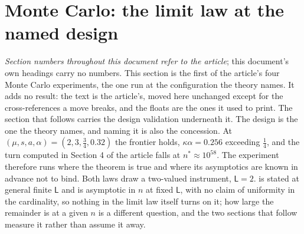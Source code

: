 \documentclass[
  12pt]{article}
\newcommand{\1}[1]{\mathds{1}\left[#1\right]}
\theoremstyle{plain}
\theoremstyle{definition}
\theoremstyle{definition}
\theoremstyle{remark}
\begin{document}
%
%
%
\clearpage

\section*{Monte Carlo: the limit law at the named design}

\emph{Section numbers throughout this document refer to the article}; this
document's own headings carry no numbers. This section is the first of the
article's four Monte Carlo experiments, the one run at the configuration the
theory names. It adds no result: the text is the article's, moved here
unchanged except for the cross-references a move breaks, and the floats are the
ones it used to print. The section that follows carries the design validation
underneath it.
The design is the one the theory names, and naming it is also the concession. At
$(\mu,s,a,\alpha)=(2,3,\tfrac34,0.32)$ the frontier holds, $\kappa\alpha=0.256$
exceeding $\tfrac14$, and the turn computed in Section 4 of the article falls at
$n^{\ast}\approx10^{58}$. The experiment therefore runs where the theorem is true
and where its asymptotics are known in advance not to bind. Both laws draw a
two-valued instrument, $\mathsf L=2$.  is stated at general finite
$\mathsf L$ and is asymptotic in $n$ at fixed $\mathsf L$, with no claim of
uniformity in the cardinality, so nothing in the limit law itself turns on it;
how large the remainder is at a given $n$ is a different question, and the two
sections that follow measure it rather than assume it away.
\end{document}
